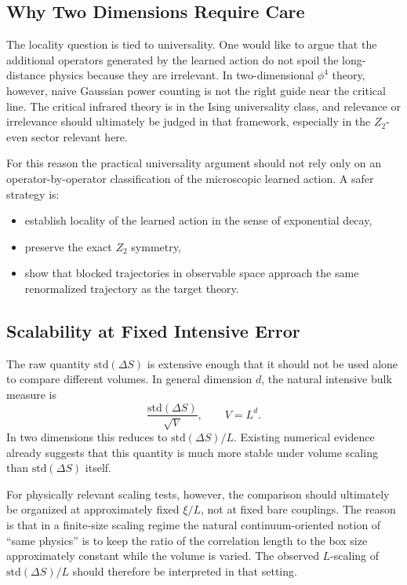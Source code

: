 \documentclass[aps,prd,reprint,nofootinbib,superscriptaddress,longbibliography]{revtex4-2}
\newcommand{\std}{\mathrm{std}}
\begin{document}
\subsection{Why Two Dimensions Require Care}

The locality question is tied to universality. One would like to argue that the
additional operators generated by the learned action do not spoil the
long-distance physics because they are irrelevant. In two-dimensional
$\phi^4$ theory, however, naive Gaussian power counting is not the right guide
near the critical line. The critical infrared theory is in the Ising
universality class, and relevance or irrelevance should ultimately be judged in
that framework, especially in the $Z_2$-even sector relevant here.

For this reason the practical universality argument should not rely only on an
operator-by-operator classification of the microscopic learned action. A safer
strategy is:
\begin{itemize}
\item establish locality of the learned action in the sense of exponential decay,
\item preserve the exact $Z_2$ symmetry,
\item show that blocked trajectories in observable space approach the same
renormalized trajectory as the target theory.
\end{itemize}

\subsection{Scalability at Fixed Intensive Error}

The raw quantity $\std(\Delta S)$ is extensive enough that it should not be used
alone to compare different volumes. In general dimension $d$, the natural
intensive bulk measure is
\begin{equation}
\frac{\std(\Delta S)}{\sqrt{V}},
\qquad V=L^d.
\end{equation}
In two dimensions this reduces to $\std(\Delta S)/L$. Existing numerical
evidence already suggests that this quantity is much more stable under volume
scaling than $\std(\Delta S)$ itself.

For physically relevant scaling tests, however, the comparison should
ultimately be organized at approximately fixed $\xi/L$, not at fixed bare
couplings. The reason is that in a finite-size scaling regime the natural
continuum-oriented notion of ``same physics'' is to keep the ratio of the
correlation length to the box size approximately constant while the volume is
varied. The observed $L$-scaling of $\std(\Delta S)/L$ should therefore be
interpreted in that setting.
\end{document}
